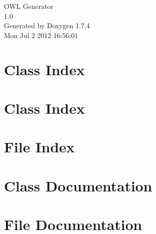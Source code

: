 \documentclass[a4paper]{book}
\begin{document}
\hypersetup{pageanchor=false}
\begin{titlepage}
\vspace*{7cm}
\begin{center}
{\Large OWL Generator \\[1ex]\large 1.0 }\\
\vspace*{1cm}
{\large Generated by Doxygen 1.7.4}\\
\vspace*{0.5cm}
{\small Mon Jul 2 2012 16:56:01}\\
\end{center}
\end{titlepage}
\clearemptydoublepage
{}
\tableofcontents
\clearemptydoublepage
{}
\hypersetup{pageanchor=true}
\chapter{Class Index}

\chapter{Class Index}

\chapter{File Index}

\chapter{Class Documentation}










\chapter{File Documentation}










\printindex
\end{document}

